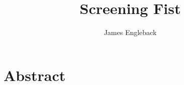 \documentclass{article}
\begin{document}
\title{\textbf{Screening Fist}}
\author{James Engleback}
\maketitle
\tableofcontents

\section{Abstract}

\printbibliography
\end{document}
